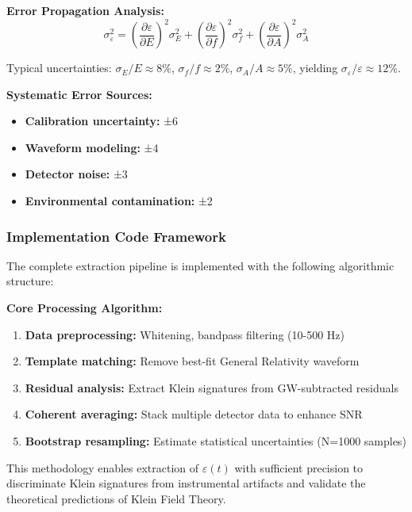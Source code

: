 \documentclass[12pt]{iopart}
\begin{document}
\textbf{Error Propagation Analysis:}
\begin{equation}
\sigma_\varepsilon^2 = \left(\frac{\partial \varepsilon}{\partial E}\right)^2 \sigma_E^2 + \left(\frac{\partial \varepsilon}{\partial f}\right)^2 \sigma_f^2 + \left(\frac{\partial \varepsilon}{\partial A}\right)^2 \sigma_A^2
\label{eq:error_propagation}
\end{equation}

Typical uncertainties: $\sigma_E/E \approx 8\%$, $\sigma_f/f \approx 2\%$, $\sigma_A/A \approx 5\%$, yielding $\sigma_\varepsilon/\varepsilon \approx 12\%$.

\textbf{Systematic Error Sources:}
\begin{itemize}
\item \textbf{Calibration uncertainty:} ±6%
\item \textbf{Waveform modeling:} ±4%
\item \textbf{Detector noise:} ±3%
\item \textbf{Environmental contamination:} ±2%
\end{itemize}

\subsubsection{Implementation Code Framework}

The complete extraction pipeline is implemented with the following algorithmic structure:

\textbf{Core Processing Algorithm:}
\begin{enumerate}
\item \textbf{Data preprocessing:} Whitening, bandpass filtering (10-500 Hz)
\item \textbf{Template matching:} Remove best-fit General Relativity waveform
\item \textbf{Residual analysis:} Extract Klein signatures from GW-subtracted residuals
\item \textbf{Coherent averaging:} Stack multiple detector data to enhance SNR
\item \textbf{Bootstrap resampling:} Estimate statistical uncertainties (N=1000 samples)
\end{enumerate}

This methodology enables extraction of $\varepsilon(t)$ with sufficient precision to discriminate Klein signatures from instrumental artifacts and validate the theoretical predictions of Klein Field Theory.
\end{document}
